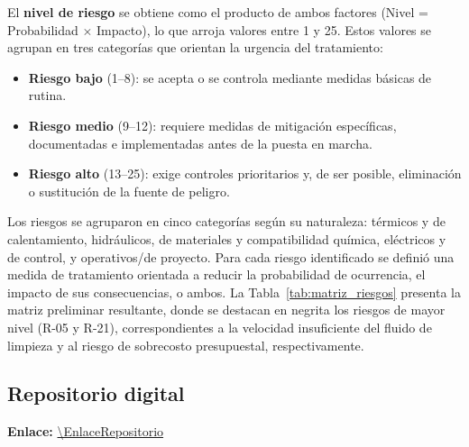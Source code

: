 El \textbf{nivel de riesgo} se obtiene como el producto de ambos factores 
(Nivel = Probabilidad $\times$ Impacto), lo que arroja valores entre 1 y 25. Estos valores 
se agrupan en tres categorías que orientan la urgencia del tratamiento:

\begin{itemize}
    \item \textbf{Riesgo bajo} (1--8): se acepta o se controla mediante medidas básicas 
    de rutina.
    \item \textbf{Riesgo medio} (9--12): requiere medidas de mitigación específicas, 
    documentadas e implementadas antes de la puesta en marcha.
    \item \textbf{Riesgo alto} (13--25): exige controles prioritarios y, de ser posible, 
    eliminación o sustitución de la fuente de peligro.
\end{itemize}

Los riesgos se agruparon en cinco categorías según su naturaleza: térmicos y de 
calentamiento, hidráulicos, de materiales y compatibilidad química, eléctricos y de 
control, y operativos/de proyecto. Para cada riesgo identificado se definió una medida de 
tratamiento orientada a reducir la probabilidad de ocurrencia, el impacto de sus 
consecuencias, o ambos. La Tabla~\ref{tab:matriz_riesgos} presenta la matriz preliminar 
resultante, donde se destacan en negrita los riesgos de mayor nivel (R-05 y R-21), 
correspondientes a la velocidad insuficiente del fluido de limpieza y al riesgo de 
sobrecosto presupuestal, respectivamente.


\subsection{Repositorio digital}
\textbf{Enlace:} \url{\EnlaceRepositorio}

